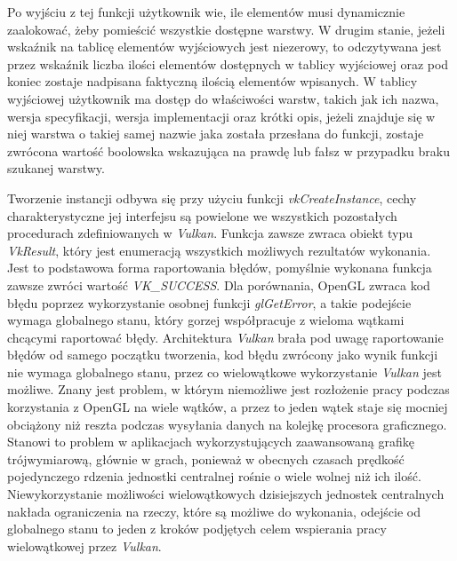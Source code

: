 Po wyjściu z tej funkcji użytkownik wie, ile elementów musi dynamicznie zaalokować, żeby pomieścić wszystkie dostępne warstwy.
W drugim stanie, jeżeli wskaźnik na tablicę elementów wyjściowych jest niezerowy, to odczytywana jest przez wskaźnik liczba ilości elementów dostępnych w tablicy wyjściowej oraz pod koniec zostaje nadpisana faktyczną ilością elementów wpisanych.
W tablicy wyjściowej użytkownik ma dostęp do właściwości warstw, takich jak ich nazwa, wersja specyfikacji, wersja implementacji oraz krótki opis, jeżeli znajduje się w niej warstwa o takiej samej nazwie jaka została przesłana do funkcji, zostaje zwrócona wartość boolowska wskazująca na prawdę lub fałsz w przypadku braku szukanej warstwy. 

Tworzenie instancji odbywa się przy użyciu funkcji \textit{vkCreateInstance}, cechy charakterystyczne jej interfejsu są powielone we wszystkich pozostałych procedurach zdefiniowanych w \textit{Vulkan}. 
Funkcja zawsze zwraca obiekt typu \textit{VkResult}, który jest enumeracją wszystkich możliwych rezultatów wykonania. Jest to podstawowa forma raportowania błędów, pomyślnie wykonana funkcja zawsze zwróci wartość \textit{VK\_SUCCESS}.
Dla porównania, OpenGL zwraca kod błędu poprzez wykorzystanie osobnej funkcji \textit{glGetError}, a takie podejście wymaga globalnego stanu, który gorzej współpracuje z wieloma wątkami chcącymi raportować błędy.
Architektura \textit{Vulkan} brała pod uwagę raportowanie błędów od samego początku tworzenia, kod błędu zwrócony jako wynik funkcji nie wymaga globalnego stanu, przez co wielowątkowe wykorzystanie \textit{Vulkan} jest możliwe.
Znany jest problem, w którym niemożliwe jest rozłożenie pracy podczas korzystania z OpenGL na wiele wątków, a przez to jeden wątek staje się mocniej obciążony niż reszta podczas wysyłania danych na kolejkę procesora graficznego. 
Stanowi to problem w aplikacjach wykorzystujących zaawansowaną grafikę trójwymiarową, głównie w grach, ponieważ w obecnych czasach prędkość pojedynczego rdzenia jednostki centralnej rośnie o wiele wolnej niż ich ilość. 
Niewykorzystanie możliwości wielowątkowych dzisiejszych jednostek centralnych nakłada ograniczenia na rzeczy, które są możliwe do wykonania, odejście od globalnego stanu to jeden z kroków podjętych celem wspierania pracy wielowątkowej przez \textit{Vulkan}.

